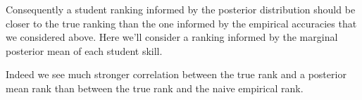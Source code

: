 \documentclass[
  letterpaper,
  DIV=11,
  numbers=noendperiod]{scrartcl}
\newenvironment{Shaded}{\begin{snugshade}}{\end{snugshade}}
\newcommand{\AttributeTok}[1]{\textcolor[rgb]{0.40,0.45,0.13}{#1}}
\newcommand{\ConstantTok}[1]{\textcolor[rgb]{0.56,0.35,0.01}{#1}}
\newcommand{\ControlFlowTok}[1]{\textcolor[rgb]{0.00,0.23,0.31}{#1}}
\newcommand{\DecValTok}[1]{\textcolor[rgb]{0.68,0.00,0.00}{#1}}
\newcommand{\FunctionTok}[1]{\textcolor[rgb]{0.28,0.35,0.67}{#1}}
\newcommand{\NormalTok}[1]{\textcolor[rgb]{0.00,0.23,0.31}{#1}}
\newcommand{\OtherTok}[1]{\textcolor[rgb]{0.00,0.23,0.31}{#1}}
\newcommand{\SpecialCharTok}[1]{\textcolor[rgb]{0.37,0.37,0.37}{#1}}
\newcommand{\StringTok}[1]{\textcolor[rgb]{0.13,0.47,0.30}{#1}}
\begin{document}
Consequently a student ranking informed by the posterior distribution
should be closer to the true ranking than the one informed by the
empirical accuracies that we considered above. Here we'll consider a
ranking informed by the marginal posterior mean of each student skill.

\begin{Shaded}
\end{Shaded}

Indeed we see much stronger correlation between the true rank and a
posterior mean rank than between the true rank and the naive empirical
rank.
\end{document}
